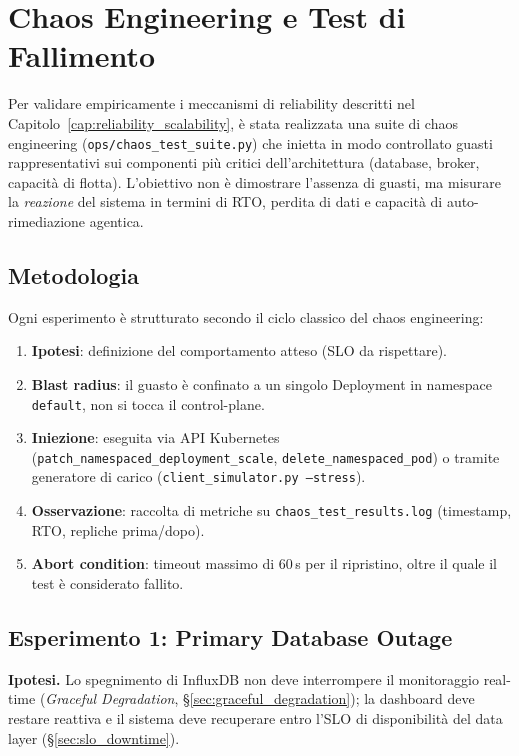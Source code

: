 
\chapter{Chaos Engineering e Test di Fallimento}
\label{cap:chaos_engineering}

Per validare empiricamente i meccanismi di reliability descritti nel Capitolo~\ref{cap:reliability_scalability}, è stata realizzata una suite di chaos engineering (\texttt{ops/chaos\_test\_suite.py}) che inietta in modo controllato guasti rappresentativi sui componenti più critici dell'architettura (database, broker, capacità di flotta). L'obiettivo non è dimostrare l'assenza di guasti, ma misurare la \textit{reazione} del sistema in termini di RTO, perdita di dati e capacità di auto-rimediazione agentica.

\section{Metodologia}
\label{sec:metodologia_chaos}
Ogni esperimento è strutturato secondo il ciclo classico del chaos engineering:
\begin{enumerate}
    \item \textbf{Ipotesi}: definizione del comportamento atteso (SLO da rispettare).
    \item \textbf{Blast radius}: il guasto è confinato a un singolo Deployment in namespace \texttt{default}, non si tocca il control-plane.
    \item \textbf{Iniezione}: eseguita via API Kubernetes (\texttt{patch\_namespaced\_deployment\_scale}, \texttt{delete\_namespaced\_pod}) o tramite generatore di carico (\texttt{client\_simulator.py --stress}).
    \item \textbf{Osservazione}: raccolta di metriche su \texttt{chaos\_test\_results.log} (timestamp, RTO, repliche prima/dopo).
    \item \textbf{Abort condition}: timeout massimo di 60\,s per il ripristino, oltre il quale il test è considerato fallito.
\end{enumerate}

\section{Esperimento 1: Primary Database Outage}
\label{sec:esperimento_1_influxdb}
\textbf{Ipotesi.} Lo spegnimento di InfluxDB non deve interrompere il monitoraggio real-time (\textit{Graceful Degradation}, §\ref{sec:graceful_degradation}); la dashboard deve restare reattiva e il sistema deve recuperare entro l'SLO di disponibilità del data layer (§\ref{sec:slo_downtime}).

